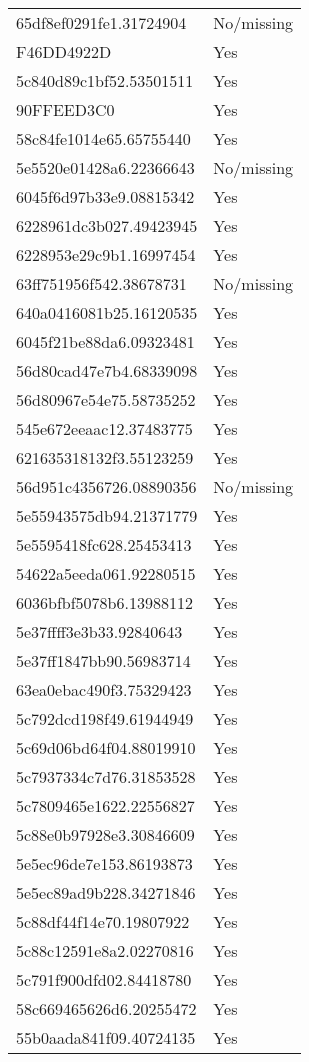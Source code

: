 \begin{tabular}{ll}
65df8ef0291fe1.31724904 & No/missing \\
F46DD4922D & Yes \\
5c840d89c1bf52.53501511 & Yes \\
90FFEED3C0 & Yes \\
58c84fe1014e65.65755440 & Yes \\
5e5520e01428a6.22366643 & No/missing \\
6045f6d97b33e9.08815342 & Yes \\
6228961dc3b027.49423945 & Yes \\
6228953e29c9b1.16997454 & Yes \\
63ff751956f542.38678731 & No/missing \\
640a0416081b25.16120535 & Yes \\
6045f21be88da6.09323481 & Yes \\
56d80cad47e7b4.68339098 & Yes \\
56d80967e54e75.58735252 & Yes \\
545e672eeaac12.37483775 & Yes \\
621635318132f3.55123259 & Yes \\
56d951c4356726.08890356 & No/missing \\
5e55943575db94.21371779 & Yes \\
5e5595418fc628.25453413 & Yes \\
54622a5eeda061.92280515 & Yes \\
6036bfbf5078b6.13988112 & Yes \\
5e37ffff3e3b33.92840643 & Yes \\
5e37ff1847bb90.56983714 & Yes \\
63ea0ebac490f3.75329423 & Yes \\
5c792dcd198f49.61944949 & Yes \\
5c69d06bd64f04.88019910 & Yes \\
5c7937334c7d76.31853528 & Yes \\
5c7809465e1622.22556827 & Yes \\
5c88e0b97928e3.30846609 & Yes \\
5e5ec96de7e153.86193873 & Yes \\
5e5ec89ad9b228.34271846 & Yes \\
5c88df44f14e70.19807922 & Yes \\
5c88c12591e8a2.02270816 & Yes \\
5c791f900dfd02.84418780 & Yes \\
58c669465626d6.20255472 & Yes \\
55b0aada841f09.40724135 & Yes \\

\end{tabular}
